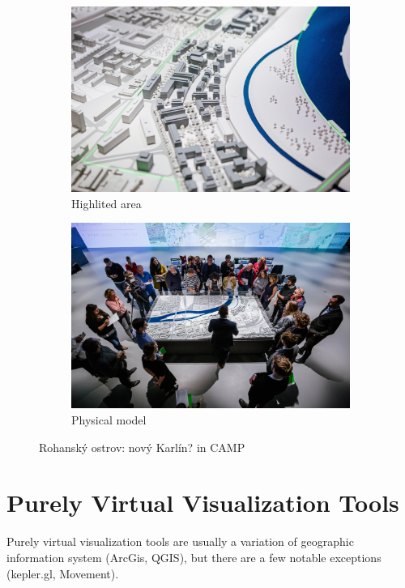 \begin{figure}[h]
    \centering
    \begin{subfigure}[t]{0.49\linewidth}
        \centering
        \includegraphics[width=\linewidth]{figures/rohan1.jpg}
        \caption{Highlited area \cite{iprRohanImages}}
        \label{fig:rohanhighlight}
    \end{subfigure}
    \begin{subfigure}[t]{0.49\linewidth}
        \centering
        \includegraphics[width=\linewidth]{figures/rohan3.jpg}
        \caption{Physical model \cite{iprRohanImages}}
        \label{fig:rohanmodel}
    \end{subfigure}
    \caption{Rohanský ostrov: nový Karlín? in CAMP}
    \label{fig:rohan}
\end{figure}


\section{Purely Virtual Visualization Tools}
Purely virtual visualization tools are usually a variation of geographic information system (ArcGis, QGIS), but there are a few notable exceptions (kepler.gl, Movement). 

